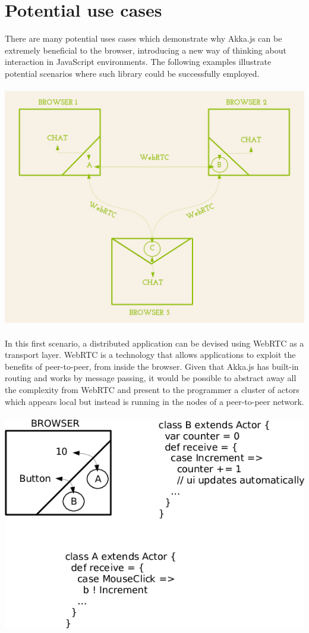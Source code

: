 \documentclass{sig-alternate}
\begin{document}
\section{Potential use cases}\label{sec:usecases}

There are many potential uses cases which demonstrate why Akka.js can be extremely beneficial to the browser, introducing a new way of thinking about interaction in JavaScript environments. The following examples illustrate
potential scenarios where such library could be successfully employed.
\\\\
\includegraphics[scale=0.5]{1.png}
\\\\
In this first scenario, a distributed application can be devised using WebRTC as a transport layer.
WebRTC is a technology that allows applications to exploit the benefits of peer-to-peer, from inside
the browser. Given that Akka.js has built-in routing and works by message passing, it would be
possible to abstract away all the complexity from WebRTC and present to the programmer a cluster of
actors which appears local but instead is running in the nodes of a peer-to-peer network.
\\\\
\includegraphics[scale=0.5]{2.png}
\end{document}
